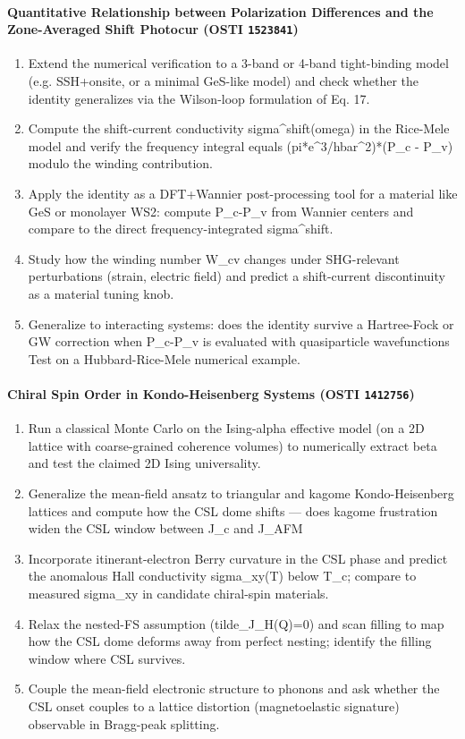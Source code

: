 \documentclass[11pt]{article}
\begin{document}
\paragraph{Quantitative Relationship between Polarization Differences and the Zone-Averaged Shift Photocur \textnormal{\small(OSTI \texttt{1523841})}}
\begin{enumerate}[leftmargin=1.6em,itemsep=0.2em,topsep=0.2em,label=Q\arabic*.]
\item Extend the numerical verification to a 3-band or 4-band tight-binding model (e.g. SSH+onsite, or a minimal GeS-like model) and check whether the identity generalizes via the Wilson-loop formulation of Eq. 17.
\item Compute the shift-current conductivity sigma\textasciicircum{}shift(omega) in the Rice-Mele model and verify the frequency integral equals (pi*e\textasciicircum{}3/hbar\textasciicircum{}2)*(P\_c - P\_v) modulo the winding contribution.
\item Apply the identity as a DFT+Wannier post-processing tool for a material like GeS or monolayer WS2: compute P\_c-P\_v from Wannier centers and compare to the direct frequency-integrated sigma\textasciicircum{}shift.
\item Study how the winding number W\_cv changes under SHG-relevant perturbations (strain, electric field) and predict a shift-current discontinuity as a material tuning knob.
\item Generalize to interacting systems: does the identity survive a Hartree-Fock or GW correction when P\_c-P\_v is evaluated with quasiparticle wavefunctions Test on a Hubbard-Rice-Mele numerical example.
\end{enumerate}
\paragraph{Chiral Spin Order in Kondo-Heisenberg Systems \textnormal{\small(OSTI \texttt{1412756})}}
\begin{enumerate}[leftmargin=1.6em,itemsep=0.2em,topsep=0.2em,label=Q\arabic*.]
\item Run a classical Monte Carlo on the Ising-alpha effective model (on a 2D lattice with coarse-grained coherence volumes) to numerically extract beta and test the claimed 2D Ising universality.
\item Generalize the mean-field ansatz to triangular and kagome Kondo-Heisenberg lattices and compute how the CSL dome shifts --- does kagome frustration widen the CSL window between J\_c and J\_AFM
\item Incorporate itinerant-electron Berry curvature in the CSL phase and predict the anomalous Hall conductivity sigma\_xy(T) below T\_c; compare to measured sigma\_xy in candidate chiral-spin materials.
\item Relax the nested-FS assumption (tilde\_J\_H(Q)=0) and scan filling to map how the CSL dome deforms away from perfect nesting; identify the filling window where CSL survives.
\item Couple the mean-field electronic structure to phonons and ask whether the CSL onset couples to a lattice distortion (magnetoelastic signature) observable in Bragg-peak splitting.
\end{enumerate}
\end{document}
